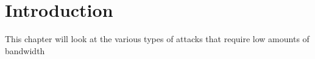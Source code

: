 
\section*{Introduction}
This chapter will look at the various types of attacks that require low amounts of bandwidth